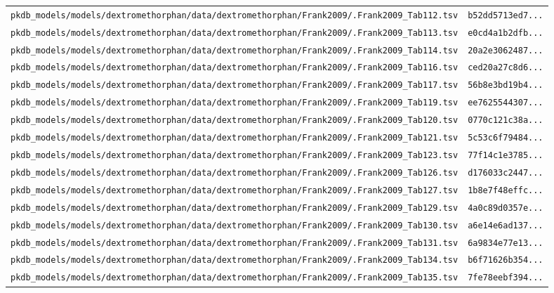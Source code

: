 \documentclass{article}
\begin{document}
\begin{longtable}{ll}
\texttt{pkdb\_models/models/dextromethorphan/data/dextromethorphan/Frank2009/.Frank2009\_Tab112.tsv} & \texttt{b52dd5713ed7...} \\
\texttt{pkdb\_models/models/dextromethorphan/data/dextromethorphan/Frank2009/.Frank2009\_Tab113.tsv} & \texttt{e0cd4a1b2dfb...} \\
\texttt{pkdb\_models/models/dextromethorphan/data/dextromethorphan/Frank2009/.Frank2009\_Tab114.tsv} & \texttt{20a2e3062487...} \\
\texttt{pkdb\_models/models/dextromethorphan/data/dextromethorphan/Frank2009/.Frank2009\_Tab116.tsv} & \texttt{ced20a27c8d6...} \\
\texttt{pkdb\_models/models/dextromethorphan/data/dextromethorphan/Frank2009/.Frank2009\_Tab117.tsv} & \texttt{56b8e3bd19b4...} \\
\texttt{pkdb\_models/models/dextromethorphan/data/dextromethorphan/Frank2009/.Frank2009\_Tab119.tsv} & \texttt{ee7625544307...} \\
\texttt{pkdb\_models/models/dextromethorphan/data/dextromethorphan/Frank2009/.Frank2009\_Tab120.tsv} & \texttt{0770c121c38a...} \\
\texttt{pkdb\_models/models/dextromethorphan/data/dextromethorphan/Frank2009/.Frank2009\_Tab121.tsv} & \texttt{5c53c6f79484...} \\
\texttt{pkdb\_models/models/dextromethorphan/data/dextromethorphan/Frank2009/.Frank2009\_Tab123.tsv} & \texttt{77f14c1e3785...} \\
\texttt{pkdb\_models/models/dextromethorphan/data/dextromethorphan/Frank2009/.Frank2009\_Tab126.tsv} & \texttt{d176033c2447...} \\
\texttt{pkdb\_models/models/dextromethorphan/data/dextromethorphan/Frank2009/.Frank2009\_Tab127.tsv} & \texttt{1b8e7f48effc...} \\
\texttt{pkdb\_models/models/dextromethorphan/data/dextromethorphan/Frank2009/.Frank2009\_Tab129.tsv} & \texttt{4a0c89d0357e...} \\
\texttt{pkdb\_models/models/dextromethorphan/data/dextromethorphan/Frank2009/.Frank2009\_Tab130.tsv} & \texttt{a6e14e6ad137...} \\
\texttt{pkdb\_models/models/dextromethorphan/data/dextromethorphan/Frank2009/.Frank2009\_Tab131.tsv} & \texttt{6a9834e77e13...} \\
\texttt{pkdb\_models/models/dextromethorphan/data/dextromethorphan/Frank2009/.Frank2009\_Tab134.tsv} & \texttt{b6f71626b354...} \\
\texttt{pkdb\_models/models/dextromethorphan/data/dextromethorphan/Frank2009/.Frank2009\_Tab135.tsv} & \texttt{7fe78eebf394...} \\

\end{longtable}
\end{document}
